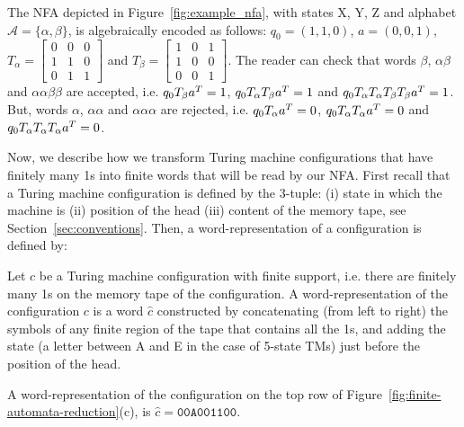 \begin{example}\label{ex:nfa}
    The NFA depicted in Figure~\ref{fig:example_nfa}, with states X, Y, Z and alphabet $\mathcal{A}=\{\alpha,\beta\}$, is algebraically encoded as follows: $q_0 = (1,1,0)$, $a=(0,0,1)$, $T_\alpha=\begin{bmatrix}
            0 & 0 & 0 \\
            1 & 1 & 0 \\
            0 & 1 & 1
        \end{bmatrix}$ and $T_\beta= \begin{bmatrix}
            1 & 0 & 1 \\
            1 & 0 & 0 \\
            0 & 0 & 1
        \end{bmatrix}$. The reader can check that words $\beta$, $\alpha\beta$ and $\alpha\alpha\beta\beta$ are accepted, i.e. $q_0T_\beta a^T = 1$, $q_0T_\alpha T_\beta a^T = 1$ and $q_0T_\alpha T_\alpha T_\beta T_\beta a ^T = 1$. But, words $\alpha$, $\alpha\alpha$ and $\alpha\alpha\alpha$ are rejected, i.e. $q_0T_\alpha a^T = 0$, $q_0T_\alpha T_\alpha a^T = 0$ and $q_0T_\alpha T_\alpha T_\alpha a ^T = 0$.
\end{example}


Now, we describe how we transform Turing machine configurations that have finitely many 1s into finite words that will be read by our NFA. First recall that a Turing machine configuration is defined by the 3-tuple: (i) state in which the machine is (ii) position of the head (iii) content of the memory tape, see Section~\ref{sec:conventions}. Then, a word-representation of a configuration is defined by:

\begin{definition}\label{def:wordc}
    Let $c$ be a Turing machine configuration with finite support, i.e. there are finitely many 1s on the memory tape of the configuration. A word-representation of the configuration $c$ is a word $\hat{c}$ constructed by concatenating (from left to right) the symbols of any finite region of the tape that contains all the 1s, and adding the state (a letter between A and E in the case of 5-state TMs) just before the position of the head.
\end{definition}

\begin{example}
    A word-representation of the configuration on the top row of Figure~\ref{fig:finite-automata-reduction}(c), is $\hat{c} = \texttt{00A001100}$.
\end{example}

